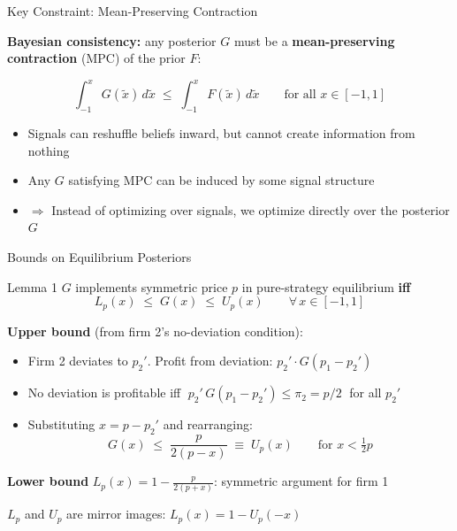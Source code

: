 \documentclass[aspectratio=169, 11pt]{beamer}
\begin{document}
\begin{frame}{Key Constraint: Mean-Preserving Contraction}

\textbf{Bayesian consistency:} any posterior $G$ must be a \textbf{mean-preserving contraction} (MPC) of the prior $F$:

$$\int_{-1}^{x} G(\tilde{x})\, d\tilde{x} \;\leq\; \int_{-1}^{x} F(\tilde{x})\, d\tilde{x} \qquad \text{for all } x \in [-1,1]$$

\bigskip

\begin{itemize}
    \item Signals can reshuffle beliefs inward, but cannot create information from nothing

    \bigskip

    \item Any $G$ satisfying MPC can be induced by some signal structure

    \bigskip

    \item $\Rightarrow$ Instead of optimizing over signals, we optimize directly over the posterior $G$
\end{itemize}

\end{frame}

\begin{frame}{Bounds on Equilibrium Posteriors}

\begin{block}{Lemma 1}
$G$ implements symmetric price $p$ in pure-strategy equilibrium \textbf{iff}
$$L_{p}(x) \;\leq\; G(x) \;\leq\; U_{p}(x) \qquad \forall\, x \in [-1,1]$$
\end{block}

\medskip

\textbf{Upper bound} (from firm 2's no-deviation condition):

\begin{itemize}
    \item Firm 2 deviates to $p_2'$. Profit from deviation: $p_2' \cdot G(p_1 - p_2')$

    \medskip

    \item No deviation is profitable iff $\;p_2'\, G(p_1 - p_2') \leq \pi_2 = p/2\;$ for all $p_2'$

    \medskip

    \item Substituting $x = p - p_2'$ and rearranging:
    $$G(x) \;\leq\; \frac{p}{2(p - x)} \;\equiv\; U_p(x) \qquad \text{for } x < \tfrac{1}{2}p$$
\end{itemize}

\medskip

\textbf{Lower bound} $L_p(x) = 1 - \frac{p}{2(p+x)}$: symmetric argument for firm 1

\medskip

\small
$L_p$ and $U_p$ are mirror images: $L_p(x) = 1 - U_p(-x)$

\end{frame}
\end{document}
